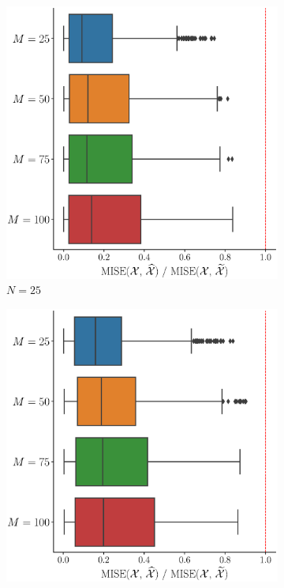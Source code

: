 \begin{results}
\begin{figure}
     \centering
     \begin{subfigure}[b]{0.49\textwidth}
         \centering
         \includegraphics[width=\textwidth]{figures/scenario_2/mise_N25.eps}
         \caption{$N = 25$}
         \label{fig:mise_mfd_2d_25}
     \end{subfigure}
     \hfill
     \begin{subfigure}[b]{0.49\textwidth}
         \centering
         \includegraphics[width=\textwidth]{figures/scenario_2/mise_N50.eps}

\end{subfigure}
\end{figure}
\end{results}
